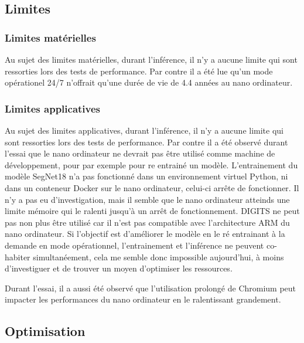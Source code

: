 \subsection{Limites}
\subsubsection{Limites matérielles}
\par Au sujet des limites matérielles, durant l'inférence, il n'y a aucune limite qui sont ressorties lors des tests de performance. Par contre il a été lue qu'un mode opérationel 24/7 n'offrait qu'une durée de vie de 4.4 années au nano ordinateur. 
\subsubsection{Limites applicatives}
\par Au sujet des limites applicatives, durant l'inférence, il n'y a aucune limite qui sont ressorties lors des tests de performance. Par contre il a été observé durant l'essai que le nano ordinateur ne devrait pas être utilisé comme machine de développement, pour par exemple pour re entrainé un modèle. L'entrainement du modèle SegNet18 n'a pas fonctionné dans un environnement virtuel Python, ni dans un conteneur Docker sur le nano ordinateur, celui-ci arrête de fonctionner. Il n'y a pas eu d'investigation, mais il semble que le nano ordinateur atteinds une limite mémoire qui le ralenti jusqu'à un arrêt de fonctionnement. DIGITS ne peut pas non plus être utilisé car il n'est pas compatible avec l'architecture ARM du nano ordinateur. Si l'objectif est d'améliorer le modèle en le ré entrainant à la demande en mode opérationnel, l'entrainement et l'inférence ne peuvent co-habiter simultanéement, cela me semble donc impossible aujourd'hui, à moins d'investiguer et de trouver un moyen d'optimiser les ressources.
\par Durant l'essai, il a aussi été observé que l'utilisation prolongé de Chromium peut impacter les performances du nano ordinateur en le ralentissant grandement. 
\subsection{Optimisation}
